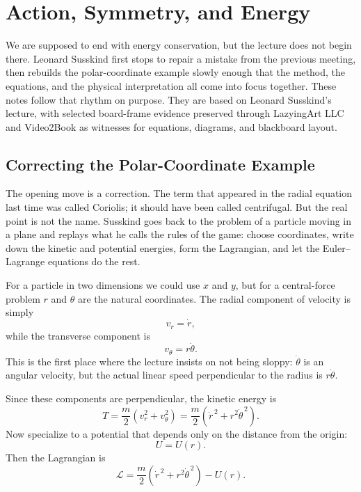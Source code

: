 \chapter{Action, Symmetry, and Energy}

We are supposed to end with energy conservation, but the lecture does not begin there. Leonard Susskind first stops to repair a mistake from the previous meeting, then rebuilds the polar-coordinate example slowly enough that the method, the equations, and the physical interpretation all come into focus together. These notes follow that rhythm on purpose. They are based on Leonard Susskind's lecture, with selected board-frame evidence preserved through LazyingArt LLC and Video2Book as witnesses for equations, diagrams, and blackboard layout.

\section{Correcting the Polar-Coordinate Example}

The opening move is a correction. The term that appeared in the radial equation last time was called Coriolis; it should have been called centrifugal. But the real point is not the name. Susskind goes back to the problem of a particle moving in a plane and replays what he calls the rules of the game: choose coordinates, write down the kinetic and potential energies, form the Lagrangian, and let the Euler--Lagrange equations do the rest.

For a particle in two dimensions we could use \(x\) and \(y\), but for a central-force problem \(r\) and \(\theta\) are the natural coordinates. The radial component of velocity is simply
\begin{equation}
v_r=\dot r,
\end{equation}
while the transverse component is
\begin{equation}
v_\theta=r\dot\theta.
\end{equation}
This is the first place where the lecture insists on not being sloppy: \(\dot\theta\) is an angular velocity, but the actual linear speed perpendicular to the radius is \(r\dot\theta\).

Since these components are perpendicular, the kinetic energy is
\begin{equation}
T=\frac{m}{2}\left(v_r^2+v_\theta^2\right)
=\frac{m}{2}\left(\dot r^{\,2}+r^2\dot\theta^{\,2}\right).
\end{equation}
Now specialize to a potential that depends only on the distance from the origin:
\begin{equation}
U=U(r).
\end{equation}
Then the Lagrangian is
\begin{equation}
\mathcal{L}=\frac{m}{2}\left(\dot r^{\,2}+r^2\dot\theta^{\,2}\right)-U(r).
\end{equation}

